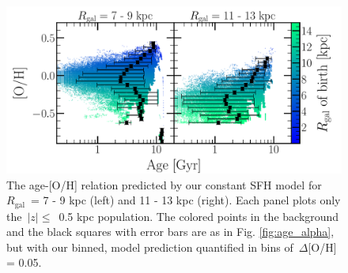 \documentclass[fleqn, usenatbib]{mnras}
\begin{document}
\begin{figure} 
\centering 
\includegraphics[scale = 0.35]{amr_static_o.pdf} 
\caption{The age-[O/H] relation predicted by our constant SFH model for 
$R_\text{gal}$~= 7 - 9 kpc (left) and 11 - 13 kpc (right). Each panel plots 
only the~$\left|z\right|\leq$~0.5 kpc population. The colored points in the 
background and the black squares with error bars are as in Fig. 
\ref{fig:age_alpha}, but with our binned, model prediction quantified in 
bins of~$\Delta$[O/H] = 0.05. } 
\label{fig:age_oh_static} 
\end{figure} 
\end{document}
